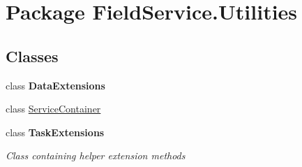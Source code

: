 \hypertarget{namespace_field_service_1_1_utilities}{\section{Package Field\+Service.\+Utilities}
\label{namespace_field_service_1_1_utilities}
}
\subsection*{Classes}
\begin{DoxyCompactItemize}
\item 
class {\bfseries Data\+Extensions}
\item 
class \hyperlink{class_field_service_1_1_utilities_1_1_service_container}{Service\+Container}
\item 
class {\bfseries Task\+Extensions}
\begin{DoxyCompactList}\small\item\em Class containing helper extension methods \end{DoxyCompactList}\end{DoxyCompactItemize}
